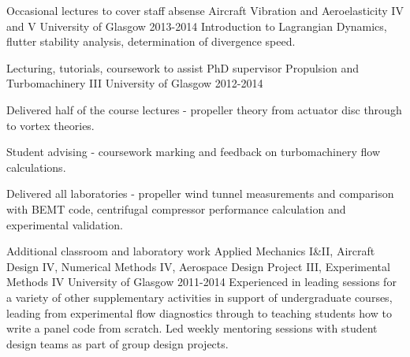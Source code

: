 \bodyfont 
\begin{cventries}
   \cventry
    {Occasional lectures to cover staff absense} %
    {Aircraft Vibration and Aeroelasticity IV and V} %
    {\hspace{-2cm}University of Glasgow} %
    {2013-2014} %
    {Introduction to Lagrangian Dynamics, flutter stability analysis, determination of divergence speed.
    }
   
      \cventry
    {Lecturing, tutorials, coursework to assist PhD supervisor} %
    {Propulsion and Turbomachinery III} %
    {\hspace{-2cm}University of Glasgow} %
    {2012-2014} %
    {\begin{cvitems}
	\item Delivered half of the course lectures - propeller theory from actuator disc through to vortex theories.
	\item Student advising - coursework marking and feedback on turbomachinery flow calculations.
	\item Delivered all laboratories - propeller wind tunnel measurements and comparison with BEMT code, centrifugal compressor performance calculation and experimental validation.
\end{cvitems}
}  

      \cventry
    {Additional classroom and laboratory work} %
    {Applied Mechanics I\&II, Aircraft Design IV, Numerical Methods IV, Aerospace Design Project III, Experimental Methods IV} %
    {\hspace{-2cm}University of Glasgow} %
    {2011-2014} %
    {Experienced in leading sessions for a variety of other supplementary activities in support of undergraduate courses, leading from experimental flow diagnostics through to teaching students how to write a panel code from scratch. Led weekly mentoring sessions with student design teams as part of group design projects.
} 

\end{cventries}
     
